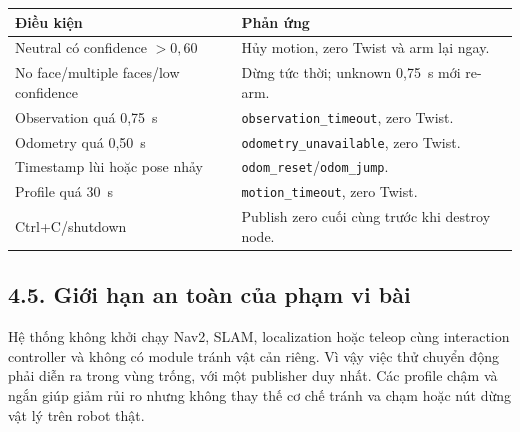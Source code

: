 \begin{center}
\begin{tabular}{@{}p{}p{}@{}}
\toprule \textbf{Điều kiện} & \textbf{Phản ứng} \\ \midrule
Neutral có confidence $>0{,}60$ & Hủy motion, zero Twist và arm lại ngay. \\
No face/multiple faces/low confidence & Dừng tức thời; unknown 0,75~s mới re-arm. \\
Observation quá 0,75~s & \texttt{observation\_timeout}, zero Twist. \\
Odometry quá 0,50~s & \texttt{odometry\_unavailable}, zero Twist. \\
Timestamp lùi hoặc pose nhảy & \texttt{odom\_reset}/\texttt{odom\_jump}. \\
Profile quá 30~s & \texttt{motion\_timeout}, zero Twist. \\
Ctrl+C/shutdown & Publish zero cuối cùng trước khi destroy node. \\
\bottomrule
\end{tabular}
\end{center}

\subsection*{4.5. Giới hạn an toàn của phạm vi bài}

Hệ thống không khởi chạy Nav2, SLAM, localization hoặc teleop cùng interaction
controller và không có module tránh vật cản riêng. Vì vậy việc thử chuyển động
phải diễn ra trong vùng trống, với một publisher  duy nhất.
Các profile chậm và ngắn giúp giảm rủi ro nhưng không thay thế cơ chế tránh va
chạm hoặc nút dừng vật lý trên robot thật.
